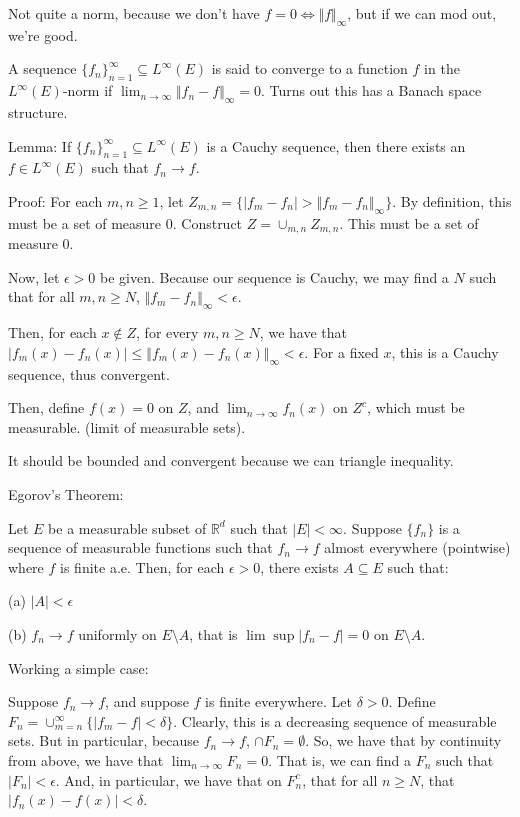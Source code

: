 \documentclass[10pt]{article}
\begin{document}
Not quite a norm, because we don’t have $f = 0 \iff \Vert f \Vert_\infty$, but if we can mod out, we’re good.

A sequence $\{ f_n \}_{n=1}^\infty \subseteq L^{\infty} (E)$ is said to converge to a function $f$ in the $L^\infty(E)$-norm if $\lim_{n\to \infty}\Vert f_n - f \Vert_\infty = 0$. Turns out this has a Banach space structure.

Lemma: If $\{ f_n \}_{n=1}^\infty \subseteq L^{\infty} (E)$ is a Cauchy sequence, then there exists an $f \in L^\infty(E)$ such that $f_n \to f$.

Proof: For each $m,n \geq 1$, let $Z_{m,n} = \{ | f_m - f_n | > \Vert f_m - f_n \Vert_\infty \}$. By definition, this must be a set of measure 0. Construct $Z = \cup_{m,n} Z_{m,n}$. This must be a set of measure 0.

Now, let $\epsilon > 0$ be given. Because our sequence is Cauchy, we may find a $N$ such that for all $m,n \geq N$, $\Vert f_m - f_n \Vert_\infty < \epsilon$.

Then, for each $x \not \in Z$, for every $m,n \geq N$, we have that $| f_m(x) - f_n(x) | \leq \Vert f_m(x) - f_n(x)\Vert_\infty < \epsilon$. For a fixed $x$, this is a Cauchy sequence, thus convergent.

Then, define $f(x) = 0$ on $Z$, and $\lim_{n \to \infty} f_n(x)$ on $Z^c$, which must be measurable. (limit of measurable sets).

It should be bounded and convergent because we can triangle inequality.

Egorov’s Theorem:

Let $E$ be a measurable subset of $\mathbb{R}^d$ such that $|E| < \infty$. Suppose $\{ f_n \}$ is a sequence of measurable functions such that $f_n \to f$ almost everywhere (pointwise) where $f$ is finite a.e. Then, for each $\epsilon > 0$, there exists $A \subseteq E$ such that:

(a) $|A| < \epsilon$

(b) $f_n \to f$ uniformly on $E \setminus A$, that is $\lim \sup |f_n -f | = 0$ on $E \setminus A$.

Working a simple case:

Suppose $f_n \to f$, and suppose $f$ is finite everywhere. Let $\delta > 0$. Define $F_n = \cup_{m=n}^\infty \{ |f_m - f| < \delta \}$. Clearly, this is a decreasing sequence of measurable sets. But in particular, because $f_n \to f$, $\cap F_n = \emptyset$. So, we have that by continuity from above, we have that $\lim_{n\to \infty} F_n = 0$. That is, we can find a $F_n$ such that $|F_n | < \epsilon$. And, in particular, we have that on $F_n^c$, that for all $n \geq N$, that $|f_n(x) - f(x)| < \delta$.
\end{document}
